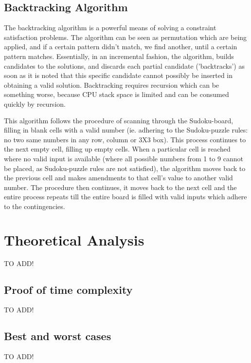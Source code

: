 \documentclass[12pt]{article}
\begin{document}
\subsection{Backtracking Algorithm}
\begin{flushleft}
The backtracking algorithm is a powerful means of solving a constraint satisfaction problems.
The algorithm can be seen as permutation which are being applied, and if a certain pattern didn't match, we find another, until a certain pattern matches.
Essentially, in an incremental fashion, the algorithm, builds candidates to the solutions, and discards each partial candidate ('backtracks') as soon as it is noted that this specific candidate cannot possibly be inserted in obtaining a valid solution. 
Backtracking requires recursion which can be something worse, because CPU stack space is limited and can be consumed quickly by recursion.
\newline

This algorithm follows the procedure of scanning through the Sudoku-board, filling in blank cells with a valid number (ie. adhering to the Sudoku-puzzle rules: no two same numbers in any row, column or 3X3 box). This process continues to the next empty cell, filling up empty cells. When a particular cell is reached where no valid input is available (where all possible numbers from 1 to 9 cannot be placed, as Sudoku-puzzle rules are not satisfied), the algorithm moves back to the previous cell and makes amendments to that cell's value to another valid number. The procedure then continues, it moves back to the next cell and the entire process repeats till the entire board is filled with valid inputs which adhere to the contingencies. 
\end{flushleft}

\section{Theoretical Analysis}
\begin{flushleft}
TO ADD!
\end{flushleft}
\subsection{Proof of time  complexity}
\begin{flushleft}
TO ADD!
\end{flushleft}

\subsection{Best and worst cases}
\begin{flushleft}
TO ADD!
\end{flushleft}
\end{document}
